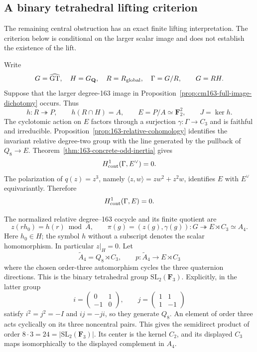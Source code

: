 \subsection{A binary tetrahedral lifting criterion}
\label{sec:163-binary-tetrahedral}

The remaining central obstruction has an exact finite lifting
interpretation. The criterion below is conditional on the larger
scalar image and does not establish the existence of the lift.

Write
\[
 G=\widehat{\mathrm{GT}},\quad H=G_{\mathbf Q},\quad
 R=R_{\rm global},\quad \Gamma=G/R,
 \qquad G=RH.
\]
Suppose that the larger degree-163 image in
Proposition~\ref{prop:cm163-full-image-dichotomy} occurs.  Thus
\[
 h:R\twoheadrightarrow P,\qquad h(R\cap H)=A,\qquad
 E=P/A\simeq\mathbf F_2^2,
 \qquad J=\ker h.
\]
The cyclotomic action on \(E\) factors through a surjection
\(\gamma:\Gamma\to C_3\) and is faithful and irreducible.
Proposition~\ref{prop:163-relative-cohomology} identifies the invariant
relative degree-two group with the line generated by the pullback of
\(Q_8\to E\). Theorem~\ref{thm:163-concrete-odd-inertia} gives
\[
 H^1_{\rm cont}(\Gamma,E^\vee)=0.
\]
The polarization of \(q(z)=z^3\), namely
\(\langle z,w\rangle=zw^2+z^2w\), identifies \(E\) with
\(E^\vee\) equivariantly.  Therefore
\begin{equation}
 H^1_{\rm cont}(\Gamma,E)=0.                 \label{eq:163-selfdual-h1-vanishing}
\end{equation}

The normalized relative degree--163 cocycle and its finite quotient are
\[
 z(rh_0)=h(r)\bmod A,\qquad
 \pi(g)=(z(g),\gamma(g)):
 G\twoheadrightarrow E\rtimes C_3\simeq A_4.
\]
Here \(h_0\in H\); the symbol \(h\) without a subscript denotes
the scalar homomorphism.  In particular \(z|_H=0\).
Let
\[
 \widetilde A_4=Q_8\rtimes C_3,
 \qquad p:\widetilde A_4\to E\rtimes C_3
\]
where the chosen order-three automorphism cycles the three quaternion
directions.  This is the binary tetrahedral group
\(\mathrm{SL}_2(\mathbf F_3)\). Explicitly, in the latter group
\[
 i=\begin{pmatrix}0&1\\-1&0\end{pmatrix},\qquad
 j=\begin{pmatrix}1&1\\1&-1\end{pmatrix}
\]
satisfy \(i^2=j^2=-I\) and \(ij=-ji\), so they generate
\(Q_8\). An element of order three acts cyclically on its three
noncentral pairs. This gives the semidirect product of order
\(8\cdot3=24=|\mathrm{SL}_2(\mathbf F_3)|\).  Its center is the kernel
\(C_2\), and its displayed \(C_3\) maps isomorphically to the
displayed complement in \(A_4\).

